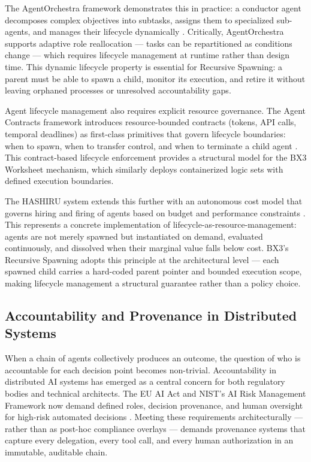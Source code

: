 The AgentOrchestra framework demonstrates this in practice: a conductor agent decomposes complex objectives into subtasks, assigns them to specialized sub-agents, and manages their lifecycle dynamically \cite{agentorchestra2025}. Critically, AgentOrchestra supports adaptive role reallocation — tasks can be repartitioned as conditions change — which requires lifecycle management at runtime rather than design time. This dynamic lifecycle property is essential for Recursive Spawning: a parent must be able to spawn a child, monitor its execution, and retire it without leaving orphaned processes or unresolved accountability gaps.

Agent lifecycle management also requires explicit resource governance. The Agent Contracts framework introduces resource-bounded contracts (tokens, API calls, temporal deadlines) as first-class primitives that govern lifecycle boundaries: when to spawn, when to transfer control, and when to terminate a child agent \cite{agentcontracts2025}. This contract-based lifecycle enforcement provides a structural model for the BX3 Worksheet mechanism, which similarly deploys containerized logic sets with defined execution boundaries.

The HASHIRU system extends this further with an autonomous cost model that governs hiring and firing of agents based on budget and performance constraints \cite{hashiru2025}. This represents a concrete implementation of lifecycle-as-resource-management: agents are not merely spawned but instantiated on demand, evaluated continuously, and dissolved when their marginal value falls below cost. BX3's Recursive Spawning adopts this principle at the architectural level — each spawned child carries a hard-coded parent pointer and bounded execution scope, making lifecycle management a structural guarantee rather than a policy choice.

\subsection{Accountability and Provenance in Distributed Systems}

When a chain of agents collectively produces an outcome, the question of who is accountable for each decision point becomes non-trivial. Accountability in distributed AI systems has emerged as a central concern for both regulatory bodies and technical architects. The EU AI Act and NIST's AI Risk Management Framework now demand defined roles, decision provenance, and human oversight for high-risk automated decisions \cite{dzone2025accountability}. Meeting these requirements architecturally — rather than as post-hoc compliance overlays — demands provenance systems that capture every delegation, every tool call, and every human authorization in an immutable, auditable chain.

